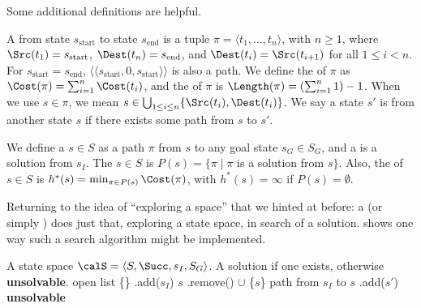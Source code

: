 Some additional definitions are helpful.

A  from state $s_\text{start}$ to state $s_\text{end}$ is a tuple $\pi=\langle t_1,\ldots,t_n\rangle$, with $n\geq 1$, where $\Src(t_1)=s_\text{start}$, $\Dest(t_n)=s_\text{end}$, and $\Dest(t_i)=\Src(t_{i+1})$ for all $1\leq i<n$. For $s_\text{start}=s_\text{end}$, $\langle\langle s_\text{start},0,s_\text{start}\rangle\rangle$ is also a path. We define the  of $\pi$ as $\Cost(\pi)=\sum_{i=1}^n\Cost(t_i)$, and the  of $\pi$ is $\Length(\pi)=(\sum_{i=1}^n1)-1$. When we use $s\in\pi$, we mean $s\in\bigcup_{1\leq i\leq n}\{\Src(t_i),\Dest(t_i)\}$. We say a state $s'$ is  from another state $s$ if there exists some path from $s$ to $s'$.

We define a  $s\in S$ as a path $\pi$ from $s$ to any goal state $s_G\in S_G$, and a  is a solution from $s_I$. The  $s\in S$ is $P(s)=\{\pi\mid\pi$ is a solution from $s\}$. Also, the  of $s\in S$ is $h^*(s)=\min_{\pi\in P(s)}\Cost(\pi)$, with $h^*(s)=\infty$ if $P(s)=\emptyset$.


Returning to the idea of ``exploring a space'' that we hinted at before: a  (or simply ) does just that, exploring a state space, in search of a solution.  shows one way such a search algorithm might be implemented.

\begin{algorithm}[H]
    \caption{State space search}
    \label{alg:sss}
    \begin{algorithmic}[1]
        \Require A state space $\calS=\langle S,\Succ,s_I,S_G\rangle$.
        \Ensure A solution if one exists, otherwise \textbf{unsolvable}.
        \State {} \ceq \New open list
        \State {} \ceq \{\}
        \State {}.add($s_I$)
        \State $s$ \ceq {}.remove()
        \State {} \ceq {} $\cup$ \{$s$\}
        \State \Return path from $s_I$ to $s$
        \EndIf
        \State {}.add($s'$)
        \EndFor
        \EndIf
        \EndWhile
        \State \Return \textbf{unsolvable}
    \end{algorithmic}
\end{algorithm}

